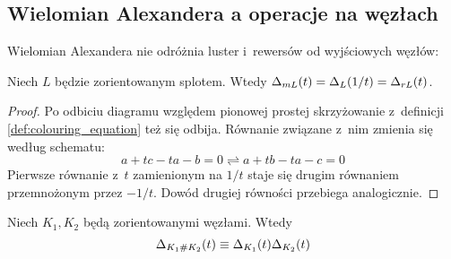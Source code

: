 
\subsection{Wielomian Alexandera a operacje na węzłach}

Wielomian Alexandera nie odróżnia luster i~rewersów od wyjściowych węzłów:

\begin{proposition}
    Niech $L$ będzie zorientowanym splotem.
    Wtedy $\Delta_{mL}(t) = \Delta_L(1/t) = \Delta_{rL}(t)$.
\end{proposition}

\begin{proof}
    Po odbiciu diagramu względem pionowej prostej skrzyżowanie z~definicji \ref{def:colouring_equation} też się odbija.
    Równanie związane z~nim zmienia się według schematu:
    \begin{equation}
        a + tc - ta - b = 0 \rightleftharpoons a + tb - ta - c = 0
    \end{equation}
    Pierwsze równanie z~$t$ zamienionym na $1/t$ staje się drugim równaniem przemnożonym przez $-1/t$.
    Dowód drugiej równości przebiega analogicznie.
\end{proof}

\begin{proposition}
    \label{prp:alexander_multiplicative}
    Niech $K_1, K_2$ będą zorientowanymi węzłami.
    Wtedy
    \begin{equation}
        \Delta_{K_1 \mathbin{\#} K_2}(t) \equiv \Delta_{K_1}(t) \Delta_{K_2}(t)
    \end{equation}
\end{proposition}

